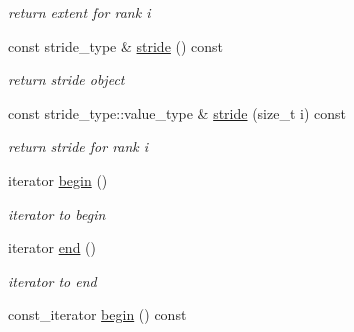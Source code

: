 \begin{DoxyCompactItemize}
\begin{DoxyCompactList}\small\item\em return extent for rank i \item\end{DoxyCompactList}\item 
\hypertarget{classbtas_1_1_tensor_aca1ac7375a59306f6c041b434d57d475}{
const stride\_\-type \& \hyperlink{classbtas_1_1_tensor_aca1ac7375a59306f6c041b434d57d475}{stride} () const }
\label{classbtas_1_1_tensor_aca1ac7375a59306f6c041b434d57d475}

\begin{DoxyCompactList}\small\item\em return stride object \item\end{DoxyCompactList}\item 
\hypertarget{classbtas_1_1_tensor_afb651fd8112140d194fb1ad86a988ea9}{
const stride\_\-type::value\_\-type \& \hyperlink{classbtas_1_1_tensor_afb651fd8112140d194fb1ad86a988ea9}{stride} (size\_\-t i) const }
\label{classbtas_1_1_tensor_afb651fd8112140d194fb1ad86a988ea9}

\begin{DoxyCompactList}\small\item\em return stride for rank i \item\end{DoxyCompactList}\item 
\hypertarget{classbtas_1_1_tensor_a733736cd31f88f0aaadf2eed08c9060b}{
iterator \hyperlink{classbtas_1_1_tensor_a733736cd31f88f0aaadf2eed08c9060b}{begin} ()}
\label{classbtas_1_1_tensor_a733736cd31f88f0aaadf2eed08c9060b}

\begin{DoxyCompactList}\small\item\em iterator to begin \item\end{DoxyCompactList}\item 
\hypertarget{classbtas_1_1_tensor_aa49c1307bb67e1dd0c72e0ad0c692d75}{
iterator \hyperlink{classbtas_1_1_tensor_aa49c1307bb67e1dd0c72e0ad0c692d75}{end} ()}
\label{classbtas_1_1_tensor_aa49c1307bb67e1dd0c72e0ad0c692d75}

\begin{DoxyCompactList}\small\item\em iterator to end \item\end{DoxyCompactList}\item 
\hypertarget{classbtas_1_1_tensor_a571bf3d5c6df260e342f596bf42bb722}{
const\_\-iterator \hyperlink{classbtas_1_1_tensor_a571bf3d5c6df260e342f596bf42bb722}{begin} () const }
\label{classbtas_1_1_tensor_a571bf3d5c6df260e342f596bf42bb722}


\end{DoxyCompactItemize}
